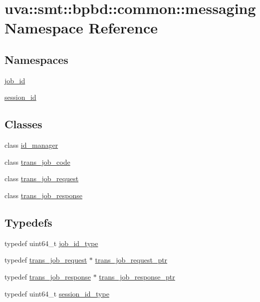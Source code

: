 \hypertarget{namespaceuva_1_1smt_1_1bpbd_1_1common_1_1messaging}{}\section{uva\+:\+:smt\+:\+:bpbd\+:\+:common\+:\+:messaging Namespace Reference}
\label{namespaceuva_1_1smt_1_1bpbd_1_1common_1_1messaging}
\subsection*{Namespaces}
\begin{DoxyCompactItemize}
\item 
 \hyperlink{namespaceuva_1_1smt_1_1bpbd_1_1common_1_1messaging_1_1job__id}{job\+\_\+id}
\item 
 \hyperlink{namespaceuva_1_1smt_1_1bpbd_1_1common_1_1messaging_1_1session__id}{session\+\_\+id}
\end{DoxyCompactItemize}
\subsection*{Classes}
\begin{DoxyCompactItemize}
\item 
class \hyperlink{classuva_1_1smt_1_1bpbd_1_1common_1_1messaging_1_1id__manager}{id\+\_\+manager}
\item 
class \hyperlink{classuva_1_1smt_1_1bpbd_1_1common_1_1messaging_1_1trans__job__code}{trans\+\_\+job\+\_\+code}
\item 
class \hyperlink{classuva_1_1smt_1_1bpbd_1_1common_1_1messaging_1_1trans__job__request}{trans\+\_\+job\+\_\+request}
\item 
class \hyperlink{classuva_1_1smt_1_1bpbd_1_1common_1_1messaging_1_1trans__job__response}{trans\+\_\+job\+\_\+response}
\end{DoxyCompactItemize}
\subsection*{Typedefs}
\begin{DoxyCompactItemize}
\item 
typedef uint64\+\_\+t \hyperlink{namespaceuva_1_1smt_1_1bpbd_1_1common_1_1messaging_af12d41e7490214ac057969e9d4af1436}{job\+\_\+id\+\_\+type}
\item 
typedef \hyperlink{classuva_1_1smt_1_1bpbd_1_1common_1_1messaging_1_1trans__job__request}{trans\+\_\+job\+\_\+request} $\ast$ \hyperlink{namespaceuva_1_1smt_1_1bpbd_1_1common_1_1messaging_af373ab262c0cab837c6ebe5e2eb62ea2}{trans\+\_\+job\+\_\+request\+\_\+ptr}
\item 
typedef \hyperlink{classuva_1_1smt_1_1bpbd_1_1common_1_1messaging_1_1trans__job__response}{trans\+\_\+job\+\_\+response} $\ast$ \hyperlink{namespaceuva_1_1smt_1_1bpbd_1_1common_1_1messaging_a13f39e68e38d11dbd940edb12359e1a3}{trans\+\_\+job\+\_\+response\+\_\+ptr}
\item 
typedef uint64\+\_\+t \hyperlink{namespaceuva_1_1smt_1_1bpbd_1_1common_1_1messaging_a17ad17f94b78abb87ab5f3f3d6f09588}{session\+\_\+id\+\_\+type}
\end{DoxyCompactItemize}
